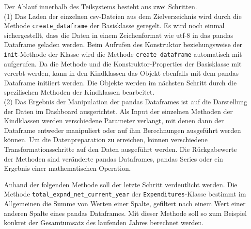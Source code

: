     Der Ablauf innerhalb des Teilsystems besteht aus zwei Schritten.\\
    (1) Das Laden der einzelnen csv-Dateien aus dem Zielverzeichnis wird durch die Methode \texttt{create\_dataframe} der Basisklasse geregelt.
    Es wird noch einmal sichergestellt, dass die Daten in einem Zeichenformat wie utf-8 in das pandas Dataframe geladen werden.
    Beim Aufrufen des Konstruktor beziehungsweise der \texttt{init}-Methode der Klasse wird die Methode \texttt{create\_dataframe} 
    automatisch mit aufgerufen. Da die Methode und die Konstruktor-Properties der Basisklasse mit vererbt werden, kann in den Kindklassen das Objekt ebenfalls mit dem 
    pandas Dataframe initiiert werden. Die Objekte werden im nächsten Schritt durch die spezifischen Methoden der Kindklassen bearbeitet.\\
    (2) Das Ergebnis der Manipulation der pandas Dataframes ist auf die Darstellung der Daten im Dashboard ausgerichtet. Als Input der einzelnen Methoden der
    Kindklassen werden verschiedene Parameter verlangt, mit denen dann der Dataframe entweder manipuliert oder auf ihm Berechnungen ausgeführt werden können. 
    Um die Datenpreparation zu erreichen, können verschiedene Transformationsschritte auf den Daten ausgeführt werden. 
    Die Rückgabewerte der Methoden sind veränderte pandas Dataframes, pandas Series oder ein Ergebnis einer mathematischen Operation.
    
    

        

    

    Anhand der folgenden Methode soll der letzte Schritt verdeutlicht werden.
    Die Methode \texttt{total\_expnd\_net\_current\_year} der \texttt{Expenditures}-Klasse bestimmt im Allgemeinen die Summe von Werten einer Spalte, gefiltert
    nach einem Wert einer anderen Spalte eines pandas Dataframes. Mit dieser Methode soll so zum Beispiel konkret der Gesamtumsatz des laufenden Jahres berechnet
    werden.


